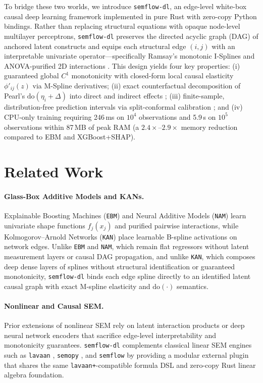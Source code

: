 To bridge these two worlds, we introduce \texttt{semflow-dl}, an edge-level white-box causal deep learning framework implemented in pure Rust with zero-copy Python bindings. Rather than replacing structural equations with opaque node-level multilayer perceptrons, \texttt{semflow-dl} preserves the directed acyclic graph (DAG) of anchored latent constructs and equips each structural edge $(i, j)$ with an interpretable univariate operator---specifically Ramsay's monotonic I-Splines \citep{ramsay1988monotone} and ANOVA-purified 2D interactions \citep{lou2013accurate}. This design yields four key properties: (i) guaranteed global $C^1$ monotonicity with closed-form local causal elasticity $\phi'_{ij}(z)$ via M-Spline derivatives; (ii) exact counterfactual decomposition of Pearl's $\mathrm{do}(\eta_i + \Delta)$ into direct and indirect effects \citep{pearl2009causality}; (iii) finite-sample, distribution-free prediction intervals via split-conformal calibration \citep{lei2018distribution}; and (iv) CPU-only training requiring 246\,ms on $10^4$ observations and 5.9\,s on $10^5$ observations within 87\,MB of peak RAM (a $2.4\times\text{--}2.9\times$ memory reduction compared to EBM and XGBoost+SHAP).

\section{Related Work}
\label{sec:related}

\paragraph{Glass-Box Additive Models and KANs.}
Explainable Boosting Machines (\texttt{EBM}) \citep{lou2013accurate} and Neural Additive Models (\texttt{NAM}) \citep{agarwal2021neural} learn univariate shape functions $f_j(x_j)$ and purified pairwise interactions, while Kolmogorov--Arnold Networks (\texttt{KAN}) \citep{liu2024kan} place learnable B-spline activations on network edges. Unlike \texttt{EBM} and \texttt{NAM}, which remain flat regressors without latent measurement layers or causal DAG propagation, and unlike \texttt{KAN}, which composes deep dense layers of splines without structural identification or guaranteed monotonicity, \texttt{semflow-dl} binds each edge spline directly to an identified latent causal graph with exact M-spline elasticity and $\mathrm{do}(\cdot)$ semantics.

\paragraph{Nonlinear and Causal SEM.}
Prior extensions of nonlinear SEM rely on latent interaction products \citep{klein2000maximum} or deep neural network encoders \citep{pearl2009causality} that sacrifice edge-level interpretability and monotonicity guarantees. \texttt{semflow-dl} complements classical linear SEM engines such as \texttt{lavaan} \citep{rosseel2012lavaan}, \texttt{semopy} \citep{igolkina2020semopy}, and \texttt{semflow} by providing a modular external plugin that shares the same \texttt{lavaan+}-compatible formula DSL and zero-copy Rust linear algebra foundation.
